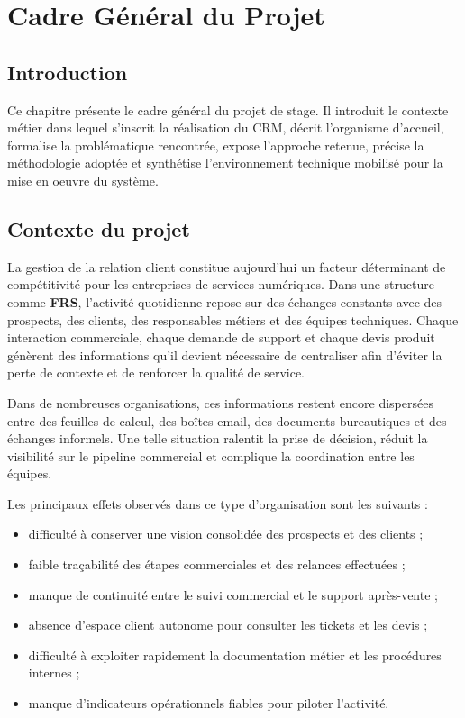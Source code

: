 \chapter{Cadre Général du Projet}
\minitoc
\newpage

\section{Introduction}
Ce chapitre présente le cadre général du projet de stage. Il introduit le contexte métier dans lequel s'inscrit la réalisation du CRM, décrit l'organisme d'accueil, formalise la problématique rencontrée, expose l'approche retenue, précise la méthodologie adoptée et synthétise l'environnement technique mobilisé pour la mise en oeuvre du système.

\section{Contexte du projet}
La gestion de la relation client constitue aujourd'hui un facteur déterminant de compétitivité pour les entreprises de services numériques. Dans une structure comme \textbf{FRS}, l'activité quotidienne repose sur des échanges constants avec des prospects, des clients, des responsables métiers et des équipes techniques. Chaque interaction commerciale, chaque demande de support et chaque devis produit génèrent des informations qu'il devient nécessaire de centraliser afin d'éviter la perte de contexte et de renforcer la qualité de service.\par
\vspace{0.3cm}

Dans de nombreuses organisations, ces informations restent encore dispersées entre des feuilles de calcul, des boîtes email, des documents bureautiques et des échanges informels. Une telle situation ralentit la prise de décision, réduit la visibilité sur le pipeline commercial et complique la coordination entre les équipes.\par
\vspace{0.3cm}

Les principaux effets observés dans ce type d'organisation sont les suivants :
\begin{itemize}
    \item difficulté à conserver une vision consolidée des prospects et des clients ;
    \item faible traçabilité des étapes commerciales et des relances effectuées ;
    \item manque de continuité entre le suivi commercial et le support après-vente ;
    \item absence d'espace client autonome pour consulter les tickets et les devis ;
    \item difficulté à exploiter rapidement la documentation métier et les procédures internes ;
    \item manque d'indicateurs opérationnels fiables pour piloter l'activité.
\end{itemize}

